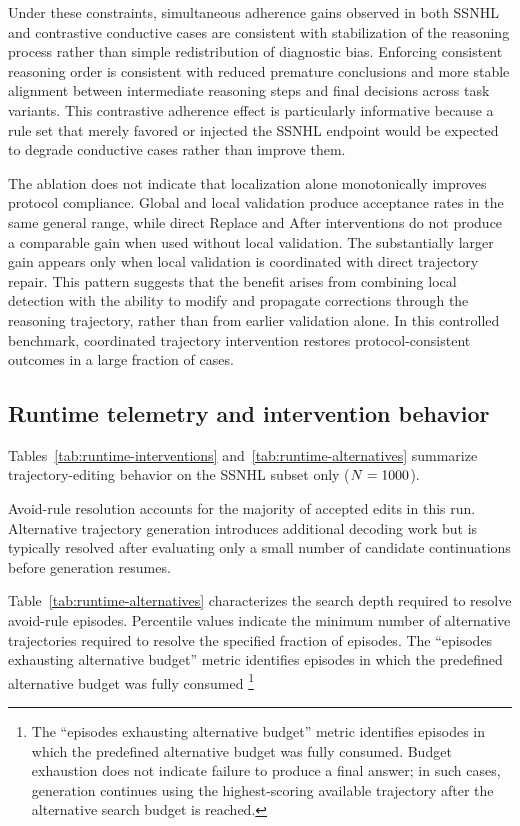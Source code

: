 \documentclass[twocolumn]{article}
\begin{document}
Under these constraints, simultaneous adherence gains observed in both SSNHL and
contrastive conductive cases are consistent with stabilization of the reasoning
process rather than simple redistribution of diagnostic bias. Enforcing
consistent reasoning order is consistent with reduced premature conclusions and
more stable alignment between intermediate reasoning steps and final decisions
across task variants. This contrastive adherence effect is particularly
informative because a rule set that merely favored or injected the SSNHL
endpoint would be expected to degrade conductive cases rather than improve them.

The ablation does not indicate that localization alone monotonically improves
protocol compliance. Global and local validation produce acceptance rates in the
same general range, while direct Replace and After interventions do not produce
a comparable gain when used without local validation. The substantially larger
gain appears only when local validation is coordinated with direct trajectory
repair. This pattern suggests that the benefit arises from combining local
detection with the ability to modify and propagate corrections through the
reasoning trajectory, rather than from earlier validation alone. In this
controlled benchmark, coordinated trajectory intervention restores
protocol-consistent outcomes in a large fraction of cases.

\subsection{Runtime telemetry and intervention behavior}

Tables~\ref{tab:runtime-interventions} and~\ref{tab:runtime-alternatives}
summarize trajectory-editing behavior on the SSNHL subset only
($N=1000$).

Avoid-rule resolution accounts for the majority of accepted edits in this run.
Alternative trajectory generation introduces additional decoding work but is
typically resolved after evaluating only a small number of candidate
continuations before generation resumes.

Table~\ref{tab:runtime-alternatives} characterizes the search depth required to
resolve avoid-rule episodes. Percentile values indicate the minimum number of
alternative trajectories required to resolve the specified fraction of episodes.
The ``episodes exhausting alternative budget'' metric identifies episodes in
which the predefined alternative budget was fully consumed%
\footnote{The ``episodes exhausting alternative budget'' metric identifies
episodes in which the predefined alternative budget was fully consumed. Budget
exhaustion does not indicate failure to produce a final answer; in such cases,
generation continues using the highest-scoring available trajectory after the
alternative search budget is reached.}
\end{document}
